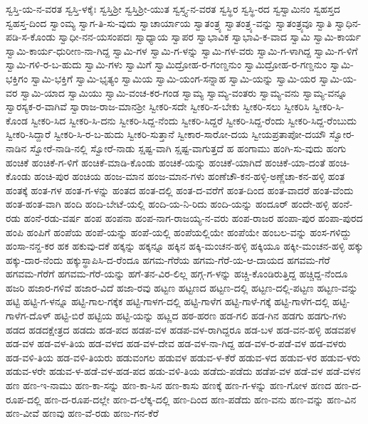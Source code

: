 ಸ್ವಸ್ತಿ-ಯ-ನ-ವರತ
ಸ್ವಸ್ತಿ-ಳಕೈಃ
ಸ್ವಸ್ತಿಶ್ರೀ
ಸ್ವಸ್ತಿಶ್ರೀ-ಯುತ
ಸ್ವಸ್ತ್ಯ-ನ-ವರತ
ಸ್ವಸ್ಥಿರ
ಸ್ವಸ್ಥಿ-ರದ
ಸ್ವಸ್ವಾಮಿನಂ
ಸ್ವಹಸ್ತದ
ಸ್ವಹಸ್ತ-ದಿಂದ
ಸ್ವಾಂಮ್ಯ
ಸ್ವಾಗ-ತಿ-ಸು-ವುದು
ಸ್ವಾಚಾರ್ಯಾಯ
ಸ್ವಾತಂತ್ರ್ಯ
ಸ್ವಾತಂತ್ರ್ಯ-ವನ್ನು
ಸ್ವಾತಂತ್ರ್ಯವೂ
ಸ್ವಾತಿ
ಸ್ವಾಧಿನ-ಪಡಿ-ಸ-ಕೊಂಡು
ಸ್ವಾಧೀ-ನನ-ಯಸಂಪದಃ
ಸ್ವಾಧ್ಯಾಯ
ಸ್ವಾಪರ
ಸ್ವಾಭಾವಿಕ
ಸ್ವಾಭಾವಿ-ಕ-ವಾದ
ಸ್ವಾಮಿ
ಸ್ವಾಮಿ-ಕಾರ್ಯ
ಸ್ವಾಮಿ-ಕಾರ್ಯ-ಧುರೀಣ-ನಾ-ಗಿದ್ದ
ಸ್ವಾಮಿ-ಗಳ
ಸ್ವಾಮಿ-ಗ-ಳನ್ನು
ಸ್ವಾಮಿ-ಗಳ-ವರು
ಸ್ವಾಮಿ-ಗ-ಳಾಗಿದ್ದ
ಸ್ವಾಮಿ-ಗ-ಳಿಗೆ
ಸ್ವಾಮಿ-ಗಳಿ-ರ-ಬ-ಹುದು
ಸ್ವಾಮಿ-ಗಳು
ಸ್ವಾಮಿಗೆ
ಸ್ವಾಮಿದ್ರೋಹ-ರ-ಗಂಣ್ಡನುಂ
ಸ್ವಾಮಿದ್ರೋಹ-ರ-ಗಣ್ಡನುಂ
ಸ್ವಾಮಿ-ಭಕ್ತಿಗಂ
ಸ್ವಾಮಿ-ಭಕ್ತಿಗೆ
ಸ್ವಾಮಿ-ಭೃತ್ಯಂ
ಸ್ವಾಮಿಯ
ಸ್ವಾಮಿ-ಯಂಗ-ಸನ್ನಾಹ
ಸ್ವಾಮಿ-ಯನ್ನು
ಸ್ವಾಮಿ-ಯರ
ಸ್ವಾಮಿ-ಯ-ವರ
ಸ್ವಾಮಿ-ಯಾದ
ಸ್ವಾಮಿಯು
ಸ್ವಾಮಿ-ವಂಚ-ಕರ-ಗಂಡ
ಸ್ವಾಮ್ಯ
ಸ್ವಾಮ್ಯ-ವಂತರು
ಸ್ವಾಮ್ಯ-ವನು
ಸ್ವಾಮ್ಯ-ವನ್ನೂ
ಸ್ವಾರಸ್ಯಕ-ರ-ವಾಗಿವೆ
ಸ್ವಾರಾಜ-ರಾಜ-ಮಾನಶ್ರೀ
ಸ್ವೀಕರಿ-ಸದೇ
ಸ್ವೀಕರಿ-ಸ-ಬೇಕು
ಸ್ವೀಕರಿ-ಸಲು
ಸ್ವೀಕರಿಸಿ
ಸ್ವೀಕರಿ-ಸಿ-ಕೊಂಡ
ಸ್ವೀಕರಿ-ಸಿದ
ಸ್ವೀಕರಿ-ಸಿ-ದನು
ಸ್ವೀಕರಿ-ಸಿದ್ದ-ನೆಂದು
ಸ್ವೀಕರಿ-ಸಿದ್ದರೆ
ಸ್ವೀಕರಿ-ಸಿದ್ದ-ರೆಂದು
ಸ್ವೀಕರಿ-ಸಿದ್ದ-ರೆಂಬುದು
ಸ್ವೀಕರಿ-ಸಿದ್ದಾರೆ
ಸ್ವೀಕರಿ-ಸಿ-ರ-ಬ-ಹುದು
ಸ್ವೀಕರಿ-ಸುತ್ತಾನೆ
ಸ್ವೀಕಾರ-ಸಾರೋ-ದಯ
ಸ್ವೀಯಪ್ರತಾಪೋ-ದಯೌ
ಸ್ವೋರ-ನಾಡಿನ
ಸ್ವೋರೆ-ನಾಡಿ-ನಲ್ಲಿ
ಸ್ವೋರೆ-ನಾಡು
ಸ್ಷಷ್ಟ-ವಾಗಿ
ಸ್ಷಷ್ಟ-ವಾಗುತ್ತದೆ
ಹ
ಹಂಗಾಮು
ಹಂಗಿ-ಸು-ವುದು
ಹಂಗು
ಹಂಚಿಕೆ
ಹಂಚಿಕೆ-ಗ-ಳಿಗೆ
ಹಂಚಿಕೆ-ಮಾಡಿ-ಕೊಂಡು
ಹಂಚಿಕೆ-ಯನ್ನು
ಹಂಚಿಕೆ-ಯಾಗಿದೆ
ಹಂಚಿಕೆ-ಯಾ-ದಂತೆ
ಹಂಚಿ-ಕೊಂಡು
ಹಂಚಿ-ಪುರ
ಹಂಚಿಯ
ಹಂಜ-ಮಾನ
ಹಂಜ-ಮಾನ-ಗಳು
ಹಂಣೆಚೌ-ಕನ-ಹಳ್ಳಿ-ಅಣ್ಣೆಚಾ-ಕನ-ಹಳ್ಳಿ
ಹಂತ
ಹಂತಕ್ಕೆ
ಹಂತ-ಗಳ
ಹಂತ-ಗ-ಳನ್ನು
ಹಂತದ
ಹಂತ-ದಲ್ಲಿ
ಹಂತ-ದ-ವರೆಗೆ
ಹಂತ-ದಿಂದ
ಹಂತ-ವಾದರೆ
ಹಂತ-ವೆಂದು
ಹಂತ-ಹಂತ-ವಾಗಿ
ಹಂದಿ
ಹಂದಿ-ಬೇಟೆ-ಯಲ್ಲಿ
ಹಂದಿ-ಯ-ನಿ-ರಿದು
ಹಂದಿ-ಯನ್ನು
ಹಂದೂರ್
ಹಂದೇ-ಹಳ್ಳಿ
ಹಂನೆ-ರಡು
ಹಂನೆ-ರಡು-ವರ್ಷ
ಹಂಪ
ಹಂಪನಾ
ಹಂಪ-ನಾಗ-ರಾಜಯ್ಯ-ನ-ವರು
ಹಂಪ-ರಾಜರ
ಹಂಪಾ-ಪುರ
ಹಂಪಾ-ಪುರದ
ಹಂಪಿ
ಹಂಪಿಗೆ
ಹಂಪೆಯ
ಹಂಪೆ-ಯನ್ನು
ಹಂಪೆ-ಯಲ್ಲಿ
ಹಂಪೆಯಲ್ಲಿಯೇ
ಹಂಪೆಯೇ
ಹಂಬಲ-ವನ್ನು
ಹಂಸ-ಗಳಿದ್ದು
ಹಂಸಾ-ನನ್ದ-ಕರ
ಹಕ
ಹಕುವು-ದಕೆ
ಹಕ್ಕನ್ನು
ಹಕ್ಕನ್ನೂ
ಹಕ್ಕಿನ
ಹಕ್ಕಿ-ಮಂಚನ-ಹಳ್ಳಿ
ಹಕ್ಕಿಯೂ
ಹಕ್ಕೀ-ಮಂಚನ-ಹಳ್ಳಿ
ಹಕ್ಕು
ಹಕ್ಕು-ದಾರ-ನೆಂದು
ಹಕ್ಕುಸ್ಥಾಪಿಸಿ-ದ-ರೆಂದೂ
ಹಗಮ-ಗೆರೆಯ
ಹಗಮ-ಗೆರೆ-ಯ-ಆ-ದಾಯದ
ಹಗವಮ-ಗೆರೆ
ಹಗವಮ-ಗೆರೆಗೆ
ಹಗವಮ-ಗೆರೆ-ಯನ್ನು
ಹಗೆ-ತನ-ವಿರ-ಲಿಲ್ಲ
ಹಗ್ಗ-ಗ-ಳನ್ನು
ಹಚ್ಚಿ-ಕೊಂಡಿರುತ್ತಿದ್ದ
ಹಚ್ಚಿದ್ದ-ನೆಂದೂ
ಹಜರಿ
ಹಜಾರ-ಗಳಿವೆ
ಹಜಾರ-ವಿದೆ
ಹಜಾ-ರವು
ಹಟ್ಟಣ
ಹಟ್ಟಣದ
ಹಟ್ಟಣ-ದಲ್ಲಿ
ಹಟ್ಟಣ-ದಲ್ಲಿ-ಪಟ್ಟಣ
ಹಟ್ಟಣ-ವನ್ನು
ಹಟ್ಟಿ
ಹಟ್ಟಿ-ಗ-ಳನ್ನೂ
ಹಟ್ಟಿ-ಗಾಲ-ಗಕ್ಕೆಕ
ಹಟ್ಟಿ-ಗಾಳಗ-ದಲ್ಲಿ
ಹಟ್ಟಿ-ಗಾಳೆಗ
ಹಟ್ಟಿ-ಗಾಳೆ-ಗಕ್ಕೆ
ಹಟ್ಟಿ-ಗಾಳೆಗ-ದಲ್ಲಿ
ಹಟ್ಟಿ-ಗಾಳೆಗ-ದೊಳ್
ಹಟ್ಟಿ-ಬಿರೆ
ಹಟ್ಟಿಯ
ಹಟ್ಟಿ-ಯನ್ನು
ಹಟ್ಣದ
ಹಠ-ಹರಣ
ಹಡ-ಗಲಿ
ಹಡ-ಗಿನ
ಹಡಗು
ಹಡಗು-ಗಳು
ಹಡದ
ಹಡದಕ್ಷೇತ್ರದ
ಹಡದು
ಹಡ-ಪದ
ಹಡಪ-ವಳ
ಹಡಪ-ವಳ-ರಾಗಿದ್ದರೂ
ಹಡ-ಬಳ
ಹಡ-ವನ-ಹಳ್ಳಿ
ಹಡವಪಳ
ಹಡ-ವಳ
ಹಡ-ವಳ-ತಿಯ
ಹಡ-ವಳದ
ಹಡ-ವಳ-ದೇವ
ಹಡ-ವಳ-ನಾ-ಗಿದ್ದ
ಹಡ-ವಳ-ರ-ಪಡೆ-ವಳ
ಹಡ-ವಳರು
ಹಡ-ವಳಿ-ತಿಯ
ಹಡ-ವಳಿ-ತಿಯರು
ಹಡುವಂಗಲ
ಹಡುವಳ
ಹಡುವ-ಳ-ಕೆರೆ
ಹಡುವ-ಳದ
ಹಡುವ-ಳರ
ಹಡುವ-ಳರು
ಹಡುವ-ಳರೇ
ಹಡುವ-ಳ-ಹಡೆ-ವಳ-ಹಡ-ಪದ
ಹಡು-ವಳಿ-ತಿಯ
ಹಡೆದು-ಪಡೆದು
ಹಡೆಪ-ವಳ
ಹಡೆ-ವಳ
ಹಡೆ-ವಳನ
ಹಣ
ಹಣ-ಇ-ನಾಮು
ಹಣ-ಕಾ-ಸನ್ನು
ಹಣ-ಕಾ-ಸಿನ
ಹಣ-ಕಾಸು
ಹಣಕ್ಕೆ
ಹಣ-ಗ-ಳನ್ನು
ಹಣ-ಗೋಳ
ಹಣದ
ಹಣ-ದ-ರೂಪ-ದಲ್ಲಿ
ಹಣ-ದ-ರೂಪ-ದಲ್ಲೇ
ಹಣ-ದ-ಲೆಕ್ಕ-ದಲ್ಲಿ
ಹಣ-ದಿಂದ
ಹಣ-ಪಡೆದು
ಹಣ-ವನು
ಹಣ-ವನ್ನು
ಹಣ-ವಿನ
ಹಣ-ವೀವೆ
ಹಣವು
ಹಣ-ವೆ-ರಡು
ಹಣು-ಗನ-ಕೆರೆ
